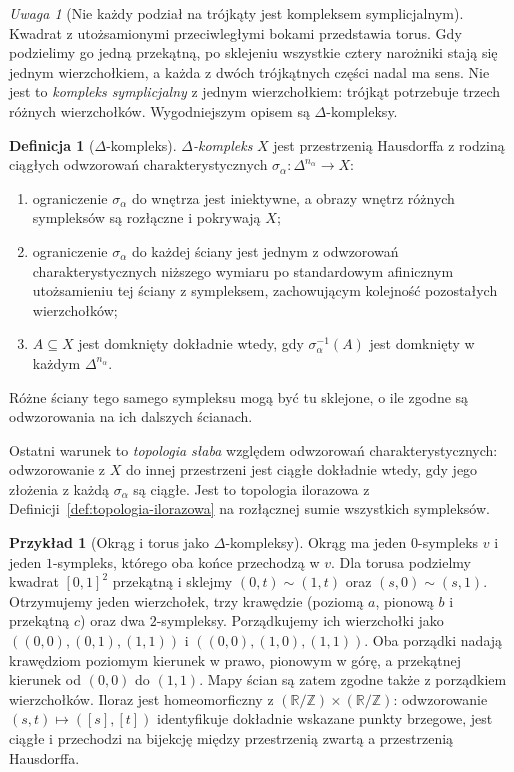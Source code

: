 \documentclass[11pt,a4paper,oneside]{report}
\newcommand{\R}{\mathbb{R}}
\newcommand{\Z}{\mathbb{Z}}
\theoremstyle{plain}
\theoremstyle{definition}
\newtheorem{definicja}[twierdzenie]{Definicja}
\newtheorem{przyklad}[twierdzenie]{Przykład}
\theoremstyle{remark}
\newtheorem{uwaga}[twierdzenie]{Uwaga}
\begin{document}
\begin{uwaga}[Nie każdy podział na trójkąty
jest kompleksem symplicjalnym]
\label{uwaga:delta-motywacja}
Kwadrat z utożsamionymi przeciwległymi
bokami przedstawia torus. Gdy podzielimy
go jedną przekątną, po sklejeniu wszystkie
cztery narożniki stają się jednym
wierzchołkiem, a każda z dwóch
trójkątnych części nadal ma sens.
Nie jest to \emph{kompleks symplicjalny}
z jednym wierzchołkiem: trójkąt
potrzebuje trzech różnych wierzchołków.
Wygodniejszym opisem są
$\Delta$-kompleksy.
\end{uwaga}

\begin{definicja}[$\Delta$-kompleks]
\label{def:delta-kompleks}
\emph{$\Delta$-kompleks} $X$ jest
przestrzenią Hausdorffa z rodziną ciągłych odwzorowań charakterystycznych
$\sigma_\alpha:\Delta^{n_\alpha}\to X$:
\begin{enumerate}[label=(\roman*),leftmargin=*]
\item ograniczenie $\sigma_\alpha$ do wnętrza
      jest iniektywne, a obrazy wnętrz
      różnych sympleksów są rozłączne
      i pokrywają $X$;
\item ograniczenie $\sigma_\alpha$ do każdej
      ściany jest jednym z odwzorowań
      charakterystycznych niższego wymiaru
      po standardowym afinicznym
      utożsamieniu tej ściany z sympleksem, zachowującym
      kolejność pozostałych wierzchołków;
\item $A\subseteq X$ jest domknięty dokładnie
      wtedy, gdy $\sigma_\alpha^{-1}(A)$
      jest domknięty w każdym
      $\Delta^{n_\alpha}$.
\end{enumerate}
Różne ściany tego samego sympleksu
mogą być tu sklejone, o ile zgodne
są odwzorowania na ich dalszych ścianach.
\end{definicja}

Ostatni warunek to \emph{topologia słaba}
względem odwzorowań charakterystycznych:
odwzorowanie z $X$ do innej przestrzeni
jest ciągłe dokładnie wtedy, gdy jego
złożenia z każdą $\sigma_\alpha$ są ciągłe.
Jest to topologia ilorazowa z
Definicji~\ref{def:topologia-ilorazowa}
na rozłącznej sumie wszystkich sympleksów.

\begin{przyklad}[Okrąg i torus jako $\Delta$-kompleksy]
\label{prz:delta-torus}
Okrąg ma jeden $0$-sympleks $v$
i jeden $1$-sympleks, którego oba końce
przechodzą w $v$. Dla torusa
podzielmy kwadrat $[0,1]^2$
przekątną i sklejmy
$(0,t)\sim(1,t)$ oraz
$(s,0)\sim(s,1)$. Otrzymujemy
jeden wierzchołek, trzy krawędzie
(poziomą $a$, pionową $b$ i przekątną
$c$) oraz dwa $2$-sympleksy. Porządkujemy ich wierzchołki jako
$((0,0),(0,1),(1,1))$ i $((0,0),(1,0),(1,1))$.
Oba porządki nadają krawędziom poziomym kierunek w prawo,
pionowym w górę, a przekątnej kierunek od $(0,0)$ do $(1,1)$.
Mapy ścian są zatem zgodne także z porządkiem wierzchołków.
Iloraz jest homeomorficzny z
$(\R/\Z)\times(\R/\Z)$:
odwzorowanie $(s,t)\mapsto([s],[t])$
identyfikuje dokładnie wskazane
punkty brzegowe, jest ciągłe
i przechodzi na bijekcję
między przestrzenią zwartą
a przestrzenią Hausdorffa.
\end{przyklad}
\end{document}
